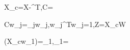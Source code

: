 X_c=X-^{\mathsf T},\qquad C=

C\mathbf w_j=\lambda_j\mathbf w_j,\qquad \mathbf w_j^{\mathsf T}\mathbf w_j=1,\qquad Z=X_cW

(X_c\mathbf w_1)=\lambda_1,\qquad \eta_1=
